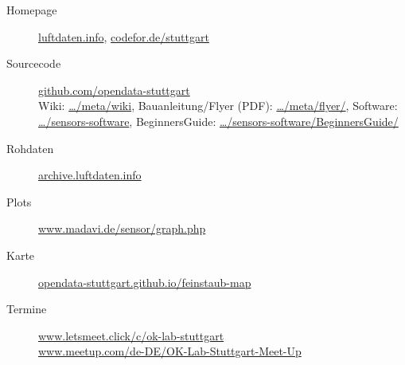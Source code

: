 \documentclass[
notumble,
]{leaflet}
\begin{document}
\begin{description}

	\item[Homepage] \href{http://luftdaten.info/}{luftdaten.info}, \href{http://codefor.de/stuttgart/}{codefor.de/stuttgart}

	\item[Sourcecode] \href{https://github.com/opendata-stuttgart/}{github.com/opendata-stuttgart}
		\\Wiki: \href{https://github.com/opendata-stuttgart/meta/wiki}{\dots/meta/wiki},
		Bauanleitung/Flyer (PDF): \href{https://github.com/opendata-stuttgart/meta/flyer/}{\dots/meta/flyer/},
		Software: \href{https://github.com/opendata-stuttgart/sensors-software}{\dots/sensors-software},
	        BeginnersGuide: \href{https://github.com/opendata-stuttgart/sensors-software/blob/master/BeginnersGuide/Guide.md}{\dots/sensors-software/BeginnersGuide/}
	\item[Rohdaten] \href{http://archive.luftdaten.info/}{archive.luftdaten.info}
	\item[Plots] \href{https://www.madavi.de/sensor/graph.php}{www.madavi.de/sensor/graph.php}
	\item[Karte] \href{https://opendata-stuttgart.github.io/feinstaub-map/}{opendata-stuttgart.github.io/feinstaub-map}
	\item[Termine] \href{https://www.letsmeet.click/c/ok-lab-stuttgart/}{www.letsmeet.click/c/ok-lab-stuttgart}
		\\\href{http://www.meetup.com/de-DE/OK-Lab-Stuttgart-Meet-Up/}{www.meetup.com/de-DE/OK-Lab-Stuttgart-Meet-Up}%
\end{description}

% 
% 
% 
\end{document}
